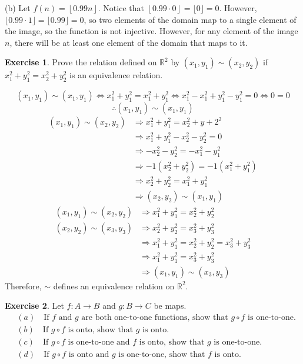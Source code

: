 \documentclass{article}
\theoremstyle{definition}
\newtheorem{environment}{Exercise}
\newenvironment{exercise}
    {\begin{mdframed}\begin{environment}}
    {\end{environment}\end{mdframed}}
\begin{document}
(b) Let \(f(n)=\left\lfloor 0.99n \right\rfloor\). Notice that \(\left\lfloor 0.99\cdot0 \right\rfloor=\lfloor 0 \rfloor=0\). However, \(\lfloor 0.99\cdot1 \rfloor=\lfloor 0.99 \rfloor=0\), so two elements of the domain map to a single element of the image, so the function is not injective. However, for any element of the image \(n\), there will be at least one element of the domain that maps to it.
\begin{exercise}
    Prove the relation defined on \(\mathbb{R} ^2\) by \(\left( x_1,y_1 \right)\sim \left( x_2,y_2 \right)  \) if \(x_1^2 +y_1^2 =x_2^2 + y_2^2\) is an equivalence relation.
\end{exercise}	
\[
   \left( x_1,y_1 \right)\sim \left( x_1,y_1 \right) \iff   x_1^2 + y_1^2 = x_1^2 + y_1^2 \iff x_1^2 - x_1^2 + y_1^2 - y_1^2 = 0 \iff 0=0
\]
\[
    \therefore (x_1,y_1)\sim (x_1,y_1)
\]
\begin{align*}
    \left( x_1,y_1 \right)\sim \left( x_2,y_2 \right)   &\Longrightarrow x_1^2 + y_1^2 = x_2^2 + y+2^2\\
    &\Longrightarrow x_1^2 + y_1^2 - x_2^2 -y_2^2 = 0\\
    &\Longrightarrow -x_2^2 -y_2^2 = -x_1^2 -y_1^2\\
    &\Longrightarrow -1\left( x_2^2 +y_2^2 \right) =-1\left( x_1^2 +y_1^2 \right) \\
    &\Longrightarrow x_2^2 +y_2^2 =x_1^2+y_1^2\\
    &\Longrightarrow \left( x_2,y_2 \right) \sim (x_1,y_1)
\end{align*}
\begin{align*}
    \left( x_1,y_1 \right) \sim \left( x_2,y_2 \right) &\Longrightarrow x_1^2 +y_1^2 = x_2^2 +y_2^2\\
    \left( x_2,y_2 \right) \sim \left( x_3,y_3 \right) &\Longrightarrow x_2^2 +y_2^2 = x_3^2 + y_3^2\\
    &\Longrightarrow x_1^2 +y_1^2 =x_2^2 +y_2^2 =x_3^2 +y_3^2\\
    &\Longrightarrow x_1^2 +y_1^2 =x_3^2 +y_3^2\\
    &\Longrightarrow \left( x_1,y_1 \right) \sim \left( x_3,y_3 \right)
\end{align*}
Therefore, \(\sim \) defines an equivalence relation on \(\mathbb{R} ^2\).
\begin{exercise}
    Let \(f:A\to B\) and \(g:B\to C\) be maps.
    \begin{align*}
        &(a)\quad\text{If }f\text{ and }g\text{ are both one-to-one functions, show that }g\circ f\text{ is one-to-one.}\\
        &(b)\quad\text{If }g\circ f\text{ is onto, show that }g\text{ is onto.}\\
        &(c)\quad\text{If }g\circ f\text{ is one-to-one and }f\text{ is onto, show that }g\text{ is one-to-one.}\\
        &(d)\quad\text{If }g\circ f\text{ is onto and }g\text{ is one-to-one, show that }f\text{ is onto.}           
    \end{align*}
\end{exercise}
\end{document}
